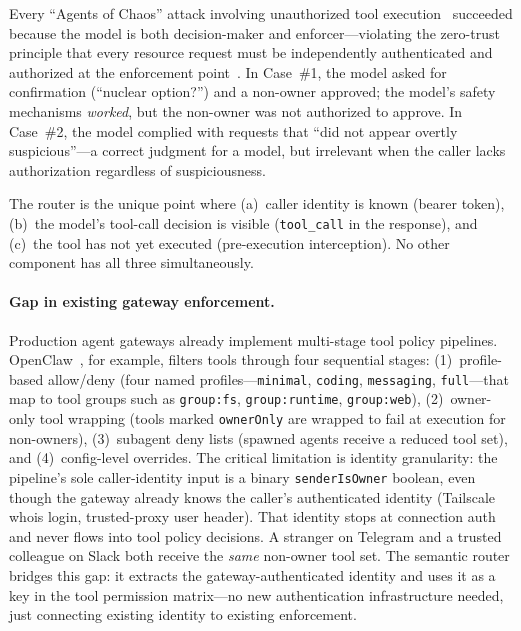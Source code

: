 \begin{opportunity}
\label{opp:rbac-enforcement}
Every ``Agents of Chaos'' attack involving unauthorized tool
execution~\cite{agentschaos2025} succeeded because the model is both
decision-maker and enforcer---violating the zero-trust principle that
every resource request must be independently authenticated and
authorized at the enforcement point~\cite{nist800207}.  In Case~\#1,
the model asked for confirmation (``nuclear option?'') and a
non-owner approved; the model's safety mechanisms
\emph{worked}, but the non-owner was not authorized to approve.
In Case~\#2, the model complied with requests that ``did not appear
overtly suspicious''---a correct judgment for a model, but irrelevant
when the caller lacks authorization regardless of suspiciousness.

The router is the unique point where (a)~caller identity is known
(bearer token), (b)~the model's tool-call decision is visible
(\texttt{tool\_call} in the response), and (c)~the tool has not yet
executed (pre-execution interception).  No other component has all
three simultaneously.

\paragraph{Gap in existing gateway enforcement.}
Production agent gateways already implement multi-stage tool policy
pipelines.  OpenClaw~\cite{openclaw2026}, for example, filters tools
through four sequential stages: (1)~profile-based allow/deny (four
named profiles---\texttt{minimal}, \texttt{coding}, \texttt{messaging},
\texttt{full}---that map to tool groups such as \texttt{group:fs},
\texttt{group:runtime}, \texttt{group:web}), (2)~owner-only tool
wrapping (tools marked \texttt{ownerOnly} are wrapped to fail at
execution for non-owners), (3)~subagent deny lists (spawned agents
receive a reduced tool set), and (4)~config-level overrides.  The
critical limitation is identity granularity: the pipeline's sole
caller-identity input is a binary \texttt{senderIsOwner} boolean,
even though the gateway already knows the caller's authenticated
identity (Tailscale whois login, trusted-proxy user header).  That
identity stops at connection auth and never flows into tool policy
decisions.  A stranger on Telegram and a trusted colleague on Slack
both receive the \emph{same} non-owner tool set.  The semantic
router bridges this gap: it extracts the gateway-authenticated
identity and uses it as a key in the tool permission matrix---no new
authentication infrastructure needed, just connecting existing
identity to existing enforcement.


\end{opportunity}

